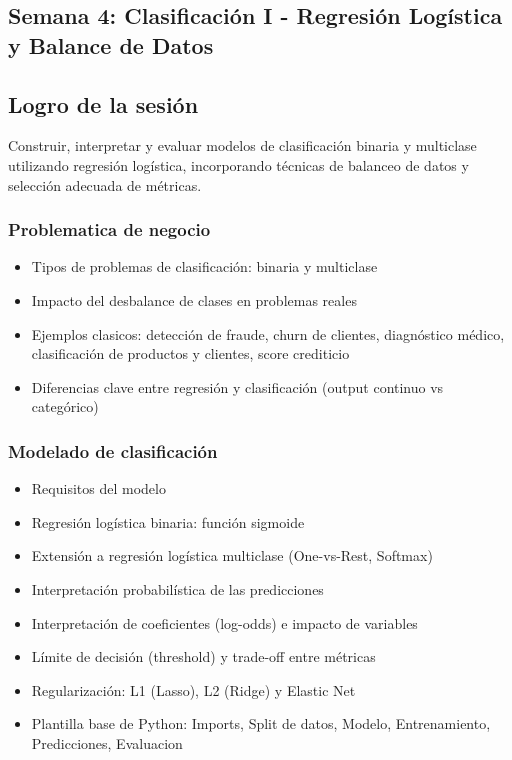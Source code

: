 \documentclass[12pt,a4paper,openany,oneside]{book}
\begin{document}
\begin{itemize}
\chapter{Semana 4: Clasificación I - Regresión Logística y Balance de Datos}

\section{Logro de la sesión}
Construir, interpretar y evaluar modelos de clasificación binaria y multiclase utilizando regresión logística, incorporando técnicas de balanceo de datos y selección adecuada de métricas.

\subsection{Problematica de negocio}
\begin{itemize}
    \item Tipos de problemas de clasificación: binaria y multiclase
    \item Impacto del desbalance de clases en problemas reales
    \item Ejemplos clasicos: detección de fraude, churn de clientes, diagnóstico médico, clasificación de productos y clientes, score crediticio
    \item Diferencias clave entre regresión y clasificación (output continuo vs categórico)
\end{itemize}

\subsection{Modelado de clasificación}
\begin{itemize}
    \item Requisitos del modelo
    \item Regresión logística binaria: función sigmoide
    \item Extensión a regresión logística multiclase (One-vs-Rest, Softmax)
    \item Interpretación probabilística de las predicciones
    \item Interpretación de coeficientes (log-odds) e impacto de variables
    \item Límite de decisión (threshold) y trade-off entre métricas
    \item Regularización: L1 (Lasso), L2 (Ridge) y Elastic Net
    \item Plantilla base de Python: Imports, Split de datos, Modelo, Entrenamiento, Predicciones, Evaluacion
\end{itemize}


\end{itemize}
\end{document}
